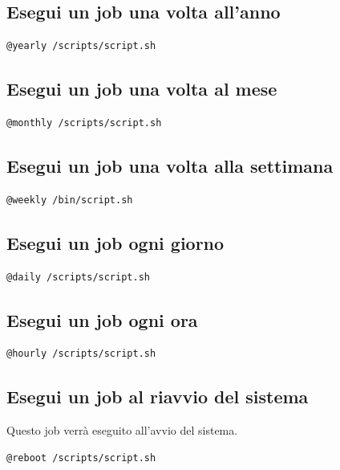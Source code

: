 \documentclass[a4paper]{report}
\newenvironment{code}{\begin{tcolorbox}[size=small]}{\end{tcolorbox}}
\begin{document}
\subsection{Esegui un job una volta all'anno}
\begin{code}
	\begin{lstlisting}              
@yearly /scripts/script.sh
	\end{lstlisting}
\end{code}

\subsection{Esegui un job una volta al mese}
\begin{code}
	\begin{lstlisting}              
@monthly /scripts/script.sh
	\end{lstlisting}
\end{code}

\subsection{Esegui un job una volta alla settimana}
\begin{code}
	\begin{lstlisting}              
@weekly /bin/script.sh
	\end{lstlisting}
\end{code}

\subsection{Esegui un job ogni giorno}
\begin{code}
	\begin{lstlisting}              
@daily /scripts/script.sh
	\end{lstlisting}
\end{code}

\subsection{Esegui un job ogni ora}
\begin{code}
	\begin{lstlisting}              
@hourly /scripts/script.sh
	\end{lstlisting}
\end{code}

\subsection{Esegui un job al riavvio del sistema}
Questo job verrà eseguito all'avvio del sistema.
\begin{code}
	\begin{lstlisting}              
@reboot /scripts/script.sh
	\end{lstlisting}
\end{code}
\end{document}
